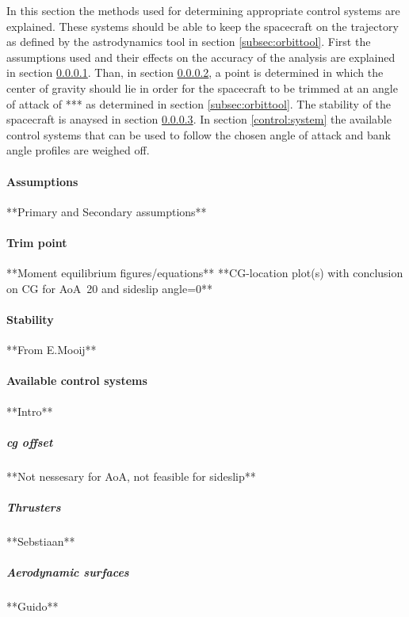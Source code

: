 In this section the methods used for determining appropriate control systems are explained. These systems should be able to keep the spacecraft on the trajectory as defined by the astrodynamics tool in section \ref{subsec:orbittool}. First the assumptions used and their effects on the accuracy of the analysis are explained in section \ref{control:assumptions}. Than, in section \ref{control:trim}, a point is determined in which the center of gravity should lie in order for the spacecraft to be trimmed at an angle of attack of *** as determined in section  \ref{subsec:orbittool}. The stability of the spacecraft is anaysed in section \ref{control:stab}. In section \ref{control:system} the available control systems that can be used to follow the chosen angle of attack and bank angle profiles are weighed off.

\paragraph{Assumptions}
\label{control:assumptions}
**Primary and Secondary assumptions**

\paragraph{Trim point}
\label{control:trim}
**Moment equilibrium figures/equations**
**CG-location plot(s)  with conclusion on CG for AoA~20 and sideslip angle=0**

\paragraph{Stability}
\label{control:stab}
**From E.Mooij**

\paragraph{Available control systems}

**Intro**

\subparagraph{\acrfull{cg} offset}

**Not nessesary for AoA, not feasible for sideslip**

\subparagraph{Thrusters}

**Sebstiaan**

\subparagraph{Aerodynamic surfaces}

**Guido**



